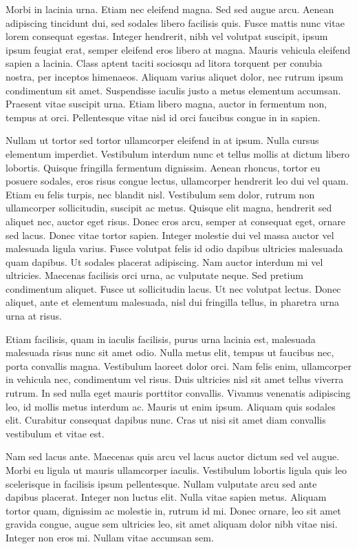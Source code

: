 Morbi in lacinia urna. Etiam nec eleifend magna. Sed sed augue arcu. Aenean adipiscing tincidunt dui, sed sodales libero facilisis quis. Fusce mattis nunc vitae lorem consequat egestas. Integer hendrerit, nibh vel volutpat suscipit, ipsum ipsum feugiat erat, semper eleifend eros libero at magna. Mauris vehicula eleifend sapien a lacinia. Class aptent taciti sociosqu ad litora torquent per conubia nostra, per inceptos himenaeos. Aliquam varius aliquet dolor, nec rutrum ipsum condimentum sit amet. Suspendisse iaculis justo a metus elementum accumsan. Praesent vitae suscipit urna. Etiam libero magna, auctor in fermentum non, tempus at orci. Pellentesque vitae nisl id orci faucibus congue in in sapien.

Nullam ut tortor sed tortor ullamcorper eleifend in at ipsum. Nulla cursus elementum imperdiet. Vestibulum interdum nunc et tellus mollis at dictum libero lobortis. Quisque fringilla fermentum dignissim. Aenean rhoncus, tortor eu posuere sodales, eros risus congue lectus, ullamcorper hendrerit leo dui vel quam. Etiam eu felis turpis, nec blandit nisl. Vestibulum sem dolor, rutrum non ullamcorper sollicitudin, suscipit ac metus. Quisque elit magna, hendrerit sed aliquet nec, auctor eget risus. Donec eros arcu, semper at consequat eget, ornare sed lacus. Donec vitae tortor sapien. Integer molestie dui vel massa auctor vel malesuada ligula varius. Fusce volutpat felis id odio dapibus ultricies malesuada quam dapibus. Ut sodales placerat adipiscing. Nam auctor interdum mi vel ultricies. Maecenas facilisis orci urna, ac vulputate neque. Sed pretium condimentum aliquet. Fusce ut sollicitudin lacus. Ut nec volutpat lectus. Donec aliquet, ante et elementum malesuada, nisl dui fringilla tellus, in pharetra urna urna at risus.

Etiam facilisis, quam in iaculis facilisis, purus urna lacinia est, malesuada malesuada risus nunc sit amet odio. Nulla metus elit, tempus ut faucibus nec, porta convallis magna. Vestibulum laoreet dolor orci. Nam felis enim, ullamcorper in vehicula nec, condimentum vel risus. Duis ultricies nisl sit amet tellus viverra rutrum. In sed nulla eget mauris porttitor convallis. Vivamus venenatis adipiscing leo, id mollis metus interdum ac. Mauris ut enim ipsum. Aliquam quis sodales elit. Curabitur consequat dapibus nunc. Cras ut nisi sit amet diam convallis vestibulum et vitae est.

Nam sed lacus ante. Maecenas quis arcu vel lacus auctor dictum sed vel augue. Morbi eu ligula ut mauris ullamcorper iaculis. Vestibulum lobortis ligula quis leo scelerisque in facilisis ipsum pellentesque. Nullam vulputate arcu sed ante dapibus placerat. Integer non luctus elit. Nulla vitae sapien metus. Aliquam tortor quam, dignissim ac molestie in, rutrum id mi. Donec ornare, leo sit amet gravida congue, augue sem ultricies leo, sit amet aliquam dolor nibh vitae nisi. Integer non eros mi. Nullam vitae accumsan sem.

